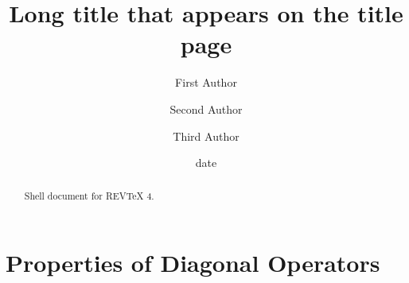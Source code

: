 \documentclass[aps,preprint]{revtex4}%
\begin{document}
\title[Short title for running header]{Long title that appears on the title page}
\author{First Author}
\author{Second Author}
\author{Third Author}

\begin{abstract}
Shell document for REV\TeX {} 4.

\end{abstract}
\date[Date text]{date}




\maketitle
\tableofcontents


\section{Properties of Diagonal Operators}
\end{document}
